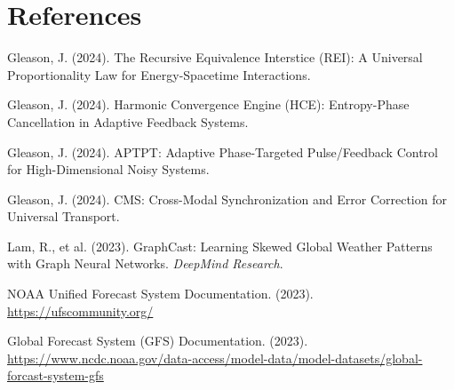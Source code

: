 \documentclass[12pt]{article}
\begin{document}
\section{References}

\begin{thebibliography}{10}

Gleason, J. (2024). The Recursive Equivalence Interstice (REI): A Universal Proportionality Law for Energy-Spacetime Interactions.

Gleason, J. (2024). Harmonic Convergence Engine (HCE): Entropy-Phase Cancellation in Adaptive Feedback Systems.

Gleason, J. (2024). APTPT: Adaptive Phase-Targeted Pulse/Feedback Control for High-Dimensional Noisy Systems.

Gleason, J. (2024). CMS: Cross-Modal Synchronization and Error Correction for Universal Transport.

Lam, R., et al. (2023). GraphCast: Learning Skewed Global Weather Patterns with Graph Neural Networks. \emph{DeepMind Research}.

NOAA Unified Forecast System Documentation. (2023). \url{https://ufscommunity.org/}

Global Forecast System (GFS) Documentation. (2023). \url{https://www.ncdc.noaa.gov/data-access/model-data/model-datasets/global-forcast-system-gfs}

\end{thebibliography}
\end{document}
